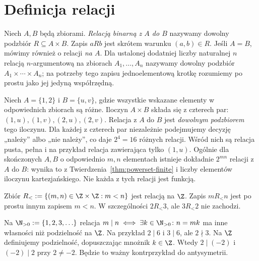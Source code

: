 \section{Definicja relacji}\label{sec:relation-definition}
\begin{definicja}\label{def:binary-relation}
Niech $A,B$ będą zbiorami. \emph{Relacją binarną z $A$ do $B$}
nazywamy dowolny podzbiór $R\subseteq A\times B$.
Zapis $aRb$ jest skrótem warunku $(a,b)\in R$.
Jeśli $A=B$, mówimy również o relacji \emph{na $A$}.
Dla ustalonej dodatniej liczby naturalnej $n$ relacją
$n$-argumentową na zbiorach $A_1,\ldots,A_n$ nazywamy
dowolny podzbiór $A_1\times\cdots\times A_n$;
na potrzeby tego zapisu jednoelementową krotkę
rozumiemy po prostu jako jej jedyną współrzędną.
\end{definicja}

\begin{przyklad}\label{ex:number-relations-xlii}
Niech $A=\{1,2\}$ i $B=\{u,v\}$, gdzie wszystkie
wskazane elementy w odpowiednich zbiorach są różne.
Iloczyn $A\times B$ składa się z czterech par:
$(1,u),(1,v),(2,u),(2,v)$. Relacja z $A$ do $B$
jest \emph{dowolnym podzbiorem} tego iloczynu.
Dla każdej z czterech par niezależnie podejmujemy
decyzję „należy” albo „nie należy”, co daje $2^4=16$
różnych relacji. Wśród nich są relacja pusta, pełna
i na przykład relacja zawierająca tylko $(1,u)$.
Ogólnie dla skończonych $A,B$ o odpowiednio $m,n$
elementach istnieje dokładnie $2^{mn}$ relacji
z $A$ do $B$: wynika to z Twierdzenia~\ref{thm:powerset-finite}
i liczby elementów iloczynu kartezjańskiego.
Nie każda z tych relacji jest funkcją.
\end{przyklad}



\begin{przyklad}
Zbiór $R_<:=\{(m,n)\in\Z\times\Z:m<n\}$
jest relacją na $\Z$. Zapis $mR_<n$ jest po prostu
innym zapisem $m<n$. W szczególności $2R_<3$,
ale $3R_<2$ nie zachodzi.
\end{przyklad}

\begin{przyklad}
Na $\N_{>0}:=\{1,2,3,\ldots\}$ relacja
$m\mid n\iff \exists k\in\N_{>0}\colon n=mk$
ma inne własności niż podzielność na $\Z$.
Na przykład $2\mid 6$ i $3\mid 6$, ale $2\nmid3$.
Na $\Z$ definiujemy podzielność, dopuszczając mnożnik $k\in\Z$.
Wtedy $2\mid(-2)$ i $(-2)\mid2$ przy $2\ne-2$.
Będzie to ważny kontrprzykład do antysymetrii.
\end{przyklad}

